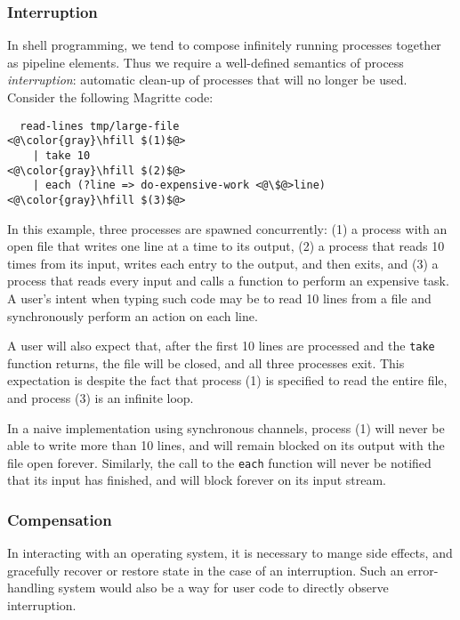\ifsigpro{ \documentclass[english,PRO]{ipsj} }
\begin{document}
\subsubsection{Interruption}
\noindent
In shell programming, we tend to compose infinitely running processes together as pipeline elements. Thus we require a well-defined semantics of process \emph{interruption}\footnotemark: automatic clean-up of processes that will no longer be used. Consider the following Magritte code:
\begin{lstlisting}
  read-lines tmp/large-file                        <@\color{gray}\hfill $(1)$@>
    | take 10                                      <@\color{gray}\hfill $(2)$@>
    | each (?line => do-expensive-work <@\$@>line) <@\color{gray}\hfill $(3)$@>
\end{lstlisting}

\noindent
In this example, three processes are spawned concurrently: (1) a process with an open file that writes one line at a time to its output, (2) a process that reads 10 times from its input, writes each entry to the output, and then exits, and (3) a process that reads every input and calls a function to perform an expensive task.
A user's intent when typing such code may be to read 10 lines from a file and synchronously perform an action on each line.

A user will also expect that, after the first 10 lines are processed and the \verb/take/ function returns, the file will be closed, and all three processes exit.
This expectation is despite the fact that process (1) is specified to read the entire file, and process (3) is an infinite loop.

In a naive implementation using synchronous channels, process (1) will never be able to write more than 10 lines, and will remain blocked on its output with the file open forever.
Similarly, the call to the \verb/each/ function will never be notified that its input has finished, and will block forever on its input stream.

\subsubsection{Compensation}\noindent
In interacting with an operating system, it is necessary to mange side effects, and gracefully recover or restore state in the case of an interruption. Such an error-handling system would also be a way for user code to directly observe interruption.
\end{document}
